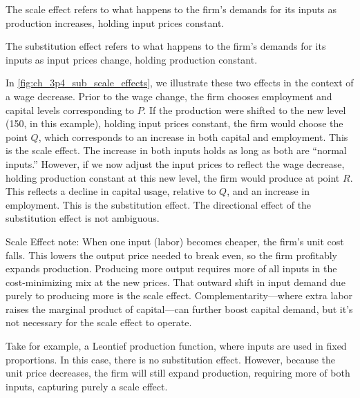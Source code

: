 \begin{definition} 
    
    The scale effect refers to what 
    happens to the firm's demands for its inputs
    as production increases, holding input prices constant.

\end{definition}

\begin{definition} 
    
    The substitution effect refers to what 
    happens to the firm's demands for its inputs
    as input prices change, holding production constant.
    
\end{definition}

In \autoref{fig:ch_3p4_sub_scale_effects},
we illustrate these two effects
in the context of a wage decrease.
Prior to the wage change, the firm chooses 
employment and capital levels corresponding to 
$P$. If the production were shifted to the new 
level (150, in this example), holding input prices constant,
the firm would choose the point $Q$, which
corresponds to an increase in both capital 
and employment. This is the scale effect. The increase 
in both inputs holds as long as both are ``normal inputs.''
However, if we now adjust the input prices
to reflect the wage decrease, holding production constant
at this new level, the firm would 
produce at point $R$. This 
reflects a decline in capital usage, relative to $Q$,
and an increase in employment. 
This is the substitution effect. The directional effect of the 
substitution effect is not ambiguous.



Scale Effect note: When one input (labor) becomes cheaper, the firm's unit cost falls. 
This lowers the output price needed to break even, so the 
firm profitably expands production. Producing more output 
requires more of all inputs in the cost-minimizing mix at the 
new prices. That outward shift in input demand due purely to 
producing more is the scale effect. Complementarity—where 
extra labor raises the marginal product of capital—can further 
boost capital demand, but it's not necessary for the scale effect to operate.

Take for example, a Leontief production function, 
where inputs are used in fixed proportions.
In this case, there is no substitution effect.
However, because the unit price decreases, 
the firm will still expand production,
requiring more of both inputs, capturing 
purely a scale effect.

